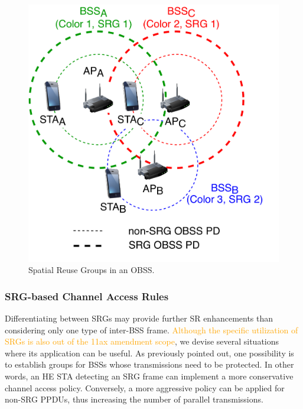 \documentclass{ieeeaccess}
\begin{document}
\begin{figure}[ht!]
	\centering
	\includegraphics[width=0.7\columnwidth]{fig_6}
	\caption{Spatial Reuse Groups in an OBSS.}
	\label{fig:fig_6}
\end{figure}

\subsubsection{SRG-based Channel Access Rules}
\label{section:srg_channel_access}
Differentiating between SRGs may provide further SR enhancements than considering only one type of inter-BSS frame. \textcolor{orange}{Although the specific utilization of SRGs is also out of the 11ax amendment scope}, we devise several situations where its application can be useful. As previously pointed out, one possibility is to establish groups for BSSs whose transmissions need to be protected. In other words, an HE STA detecting an SRG frame can implement a more conservative channel access policy. Conversely, a more aggressive policy can be applied for non-SRG PPDUs, thus increasing the number of parallel transmissions. 
\end{document}
